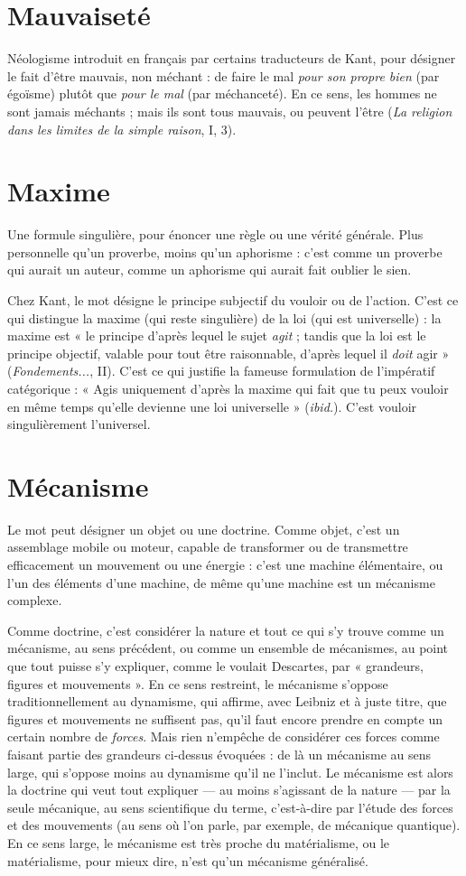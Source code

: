 \section{Mauvaiseté}
Néologisme introduit en français par certains traducteurs
de Kant, pour désigner le fait d’être mauvais, non méchant :
de faire le mal {\it pour son propre bien} (par égoïsme) plutôt que {\it pour le mal} (par
méchanceté). En ce sens, les hommes ne sont jamais méchants ; mais ils sont tous
mauvais, ou peuvent l'être ({\it La religion dans les limites de la simple raison}, I, 3).

\section{Maxime}
Une formule singulière, pour énoncer une règle ou une vérité générale.
Plus personnelle qu’un proverbe, moins qu’un aphorisme :
c'est comme un proverbe qui aurait un auteur, comme un aphorisme qui aurait
fait oublier le sien.

Chez Kant, le mot désigne le principe subjectif du vouloir ou de l’action.
C'est ce qui distingue la maxime (qui reste singulière) de la loi (qui est
universelle) : la maxime est « le principe d’après lequel le sujet {\it agit} ; tandis que
la loi est le principe objectif, valable pour tout être raisonnable, d’après lequel
il {\it doit} agir » ({\it Fondements...}, II). C’est ce qui justifie la fameuse formulation de
l'impératif catégorique : « Agis uniquement d’après la maxime qui fait que tu
peux vouloir en même temps qu’elle devienne une loi universelle » ({\it ibid.}). C’est
vouloir singulièrement l’universel.

\section{Mécanisme}
Le mot peut désigner un objet ou une doctrine. Comme objet,
c'est un assemblage mobile ou moteur, capable de transformer
ou de transmettre efficacement un mouvement ou une énergie : c’est
une machine élémentaire, ou l’un des éléments d’une machine, de même
qu'une machine est un mécanisme complexe.

Comme doctrine, c’est considérer la nature et tout ce qui s’y trouve comme
un mécanisme, au sens précédent, ou comme un ensemble de mécanismes, au
point que tout puisse s’y expliquer, comme le voulait Descartes, par « grandeurs,
figures et mouvements ». En ce sens restreint, le mécanisme s’oppose traditionnellement
au dynamisme, qui affirme, avec Leibniz et à juste titre, que
figures et mouvements ne suffisent pas, qu’il faut encore prendre en compte un
certain nombre de {\it forces}. Mais rien n’empêche de considérer ces forces comme
faisant partie des grandeurs ci-dessus évoquées : de là un mécanisme au sens
large, qui s'oppose moins au dynamisme qu’il ne l’inclut. Le mécanisme est
alors la doctrine qui veut tout expliquer — au moins s’agissant de la nature — par
la seule mécanique, au sens scientifique du terme, c’est-à-dire par l’étude des
forces et des mouvements (au sens où l’on parle, par exemple, de mécanique
quantique). En ce sens large, le mécanisme est très proche du matérialisme, ou
le matérialisme, pour mieux dire, n’est qu’un mécanisme généralisé.

